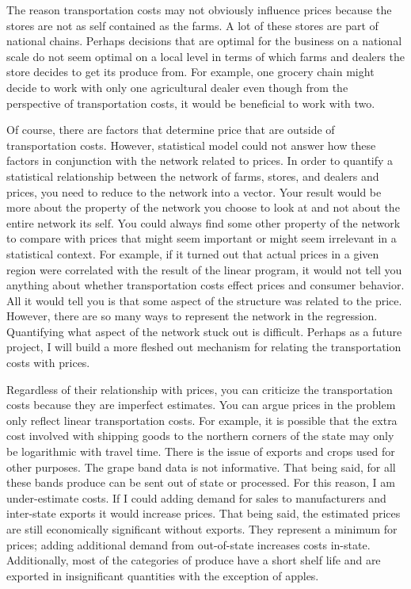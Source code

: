 \documentclass{report}
\begin{document}
The reason transportation costs may not obviously influence prices because the stores are not as self contained as the farms. A lot of these stores are part of national chains. Perhaps decisions that are optimal for the business on a national scale do not seem optimal on a local level in terms of which farms and dealers the store decides to get its produce from. For example, one grocery chain might decide to work with only one agricultural dealer even though from the perspective of transportation costs, it would be beneficial to work with two.

Of course, there are factors that determine price that are outside of transportation costs. However, statistical model could not answer how these factors in conjunction with the network related to prices. In order to quantify a statistical relationship between the network of farms, stores, and dealers and prices, you need to reduce to the network into a vector. Your result would be more about the property of the network you choose to look at and not about the entire network its self. You could always find some other property of the network to compare with prices that might seem important or might seem irrelevant in a statistical context. For example, if it turned out that actual prices in a given region were correlated with the result of the linear program, it would not tell you anything about whether transportation costs effect prices and consumer behavior. All it would tell you is that some aspect of the structure was related to the price. However, there are so many ways to represent the network in the regression. Quantifying what aspect of the network stuck out is difficult. Perhaps as a future project, I will build a more fleshed out mechanism for relating the transportation costs with prices.

Regardless of their relationship with prices, you can criticize the transportation costs because they are imperfect estimates. You can argue prices in the problem only reflect linear transportation costs. For example, it is possible that the extra cost involved with shipping goods to the northern corners of the state may only be logarithmic with travel time. There is the issue of exports and crops used for other purposes. The grape band data is not informative. That being said, for all these bands produce can be sent out of state or processed. For this reason, I am under-estimate costs. If I could adding demand for sales to manufacturers and inter-state exports it would increase prices. That being said, the estimated prices are still economically significant without exports. They represent a minimum for prices; adding additional demand from out-of-state increases costs in-state. Additionally, most of the categories of produce have a short shelf life and are exported in insignificant quantities with the exception of apples.
\end{document}
